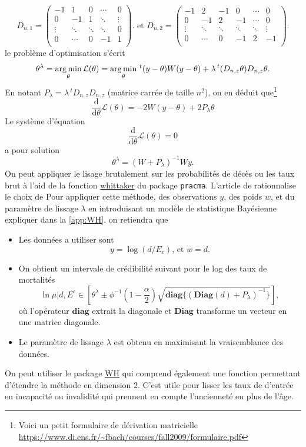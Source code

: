 $$
D_{n,1} = \left(\begin{array}{cccccc}
-1&1&0&\cdots&0\\
0&-1&1&\ddots&\vdots\\
\vdots&\ddots&\ddots&\ddots&0\\
0&\cdots&0&-1&1\\
\end{array}\right).
\text{ et } D_{n,2} = \left(\begin{array}{cccccc}
-1&2&-1&0&\cdots&0\\
0&-1&2&-1&\cdots&0\\
\vdots&\ddots&\ddots&\ddots&\ddots&\vdots\\
0&\cdots&0&-1&2&-1\\
\end{array}\right).
$$
le problème d'optimisation s'écrit 
$$
\theta^\lambda = \operatorname*{arg\,min}_{\theta} \mathcal{L}(\theta)= \operatorname*{arg\,min}_{\theta} \,^t(y - \theta)W(y-\theta)+\lambda\,^t(D_{n,z}\theta)D_{n,z}\theta. 
$$
En notant $P_{\lambda} = \lambda \,^t D_{n,z}D_{n,z}$ (matrice carrée de taille $n^2$), on en déduit que\footnote{Voici un petit formulaire de dérivation matricielle \url{https://www.di.ens.fr/~fbach/courses/fall2009/formulaire.pdf}}
$$
\frac{\text{d} }{\text{d} \theta}\mathcal{L}(\theta) =  -2W(y - \theta)+2P_\lambda\theta
$$
Le système d'équation 
$$
\frac{\text{d} }{\text{d} \theta}\mathcal{L}(\theta)=0
$$
a pour solution
$$
\theta^\lambda = \left(W + P_\lambda\right)^{-1}Wy.
$$ 
On peut appliquer le lisage brutalement sur les probabilités de décès ou les taux brut à l'aid de la fonction \href{https://search.r-project.org/CRAN/refmans/pracma/html/whittaker.html}{whittaker} du package \texttt{pracma}. L'article de \citet{Biessy2023} rationnalise le choix  de Pour appliquer cette méthode, des observations $y$, des poids $w$, et du paramètre de lissage $\lambda$ en introduisant un modèle de statistique Bayésienne expliquer dans la \cref{app:WH}. on retiendra que 
\begin{itemize}
  \item Les données a utiliser sont
  $$
y = \log(d/E_c)\text{, et }w = d.
  $$
  \item On obtient un intervale de crédibilité suivant pour le log des taux de mortalités
  $$
\ln\mu|d,E^c\in\left[\theta^\lambda\pm\phi^{-1}\left(1-\frac{\alpha}{2}\right)\sqrt{\textbf{diag}\{(\textbf{Diag}(d)+P_\lambda)^{-1}\}}\right],
  $$
  où l'opérateur $\textbf{diag}$ extrait la diagonale et $\textbf{Diag}$ transforme un vecteur en une matrice diagonale. 
  \item Le paramètre de lissage $\lambda$ est obtenu en maximisant la vraisemblance des données.  
\end{itemize}
On peut utiliser le package \href{https://cran.r-project.org/web/packages/WH/index.html}{WH} qui comprend également une fonction permettant d'étendre la méthode en dimension $2$. C'est utile pour lisser les taux de d'entrée en incapacité ou invalidité qui prennent en compte l'ancienneté en plus de l'âge. 


